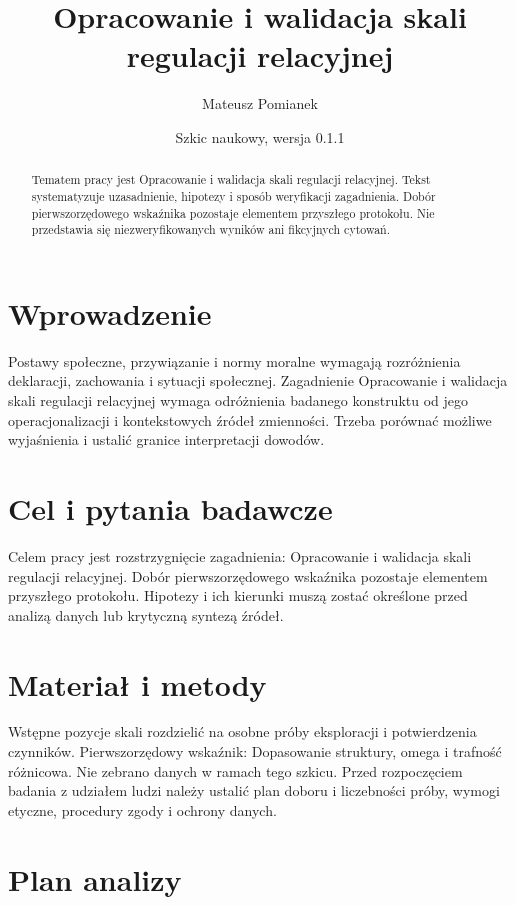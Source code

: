\documentclass[11pt,a4paper]{article}
\title{Opracowanie i walidacja skali regulacji relacyjnej}
\author{Mateusz Pomianek}
\date{Szkic naukowy, wersja 0.1.1}
\begin{document}
\maketitle

\begin{abstract}

Tematem pracy jest Opracowanie i walidacja skali regulacji relacyjnej. Tekst systematyzuje uzasadnienie, hipotezy i sposób weryfikacji zagadnienia. Dobór pierwszorzędowego wskaźnika pozostaje elementem przyszłego protokołu. Nie przedstawia się niezweryfikowanych wyników ani fikcyjnych cytowań.

\end{abstract}

\section{Wprowadzenie}

Postawy społeczne, przywiązanie i normy moralne wymagają rozróżnienia deklaracji, zachowania i sytuacji społecznej. Zagadnienie Opracowanie i walidacja skali regulacji relacyjnej wymaga odróżnienia badanego konstruktu od jego operacjonalizacji i kontekstowych źródeł zmienności. Trzeba porównać możliwe wyjaśnienia i ustalić granice interpretacji dowodów.

\section{Cel i pytania badawcze}

Celem pracy jest rozstrzygnięcie zagadnienia: Opracowanie i walidacja skali regulacji relacyjnej. Dobór pierwszorzędowego wskaźnika pozostaje elementem przyszłego protokołu. Hipotezy i ich kierunki muszą zostać określone przed analizą danych lub krytyczną syntezą źródeł.

\section{Materiał i metody}

Wstępne pozycje skali rozdzielić na osobne próby eksploracji i potwierdzenia czynników. Pierwszorzędowy wskaźnik: Dopasowanie struktury, omega i trafność różnicowa. Nie zebrano danych w ramach tego szkicu. Przed rozpoczęciem badania z udziałem ludzi należy ustalić plan doboru i liczebności próby, wymogi etyczne, procedury zgody i ochrony danych.

\section{Plan analizy}
\end{document}
